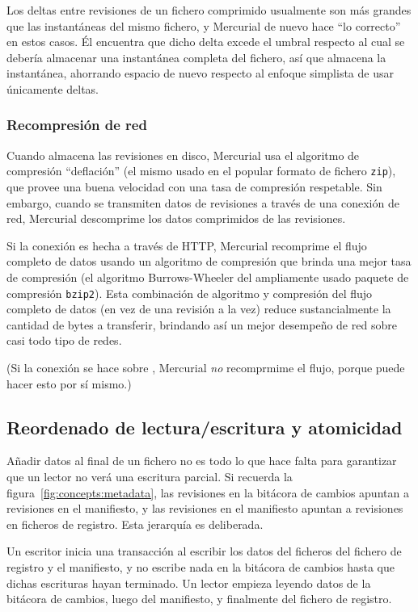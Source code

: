 Los deltas entre revisiones de un fichero comprimido usualmente son
más grandes que las instantáneas del mismo fichero, y Mercurial de
nuevo hace ``lo correcto'' en estos casos. Él encuentra que dicho
delta excede el umbral respecto al cual se debería almacenar una
instantánea completa del fichero, así que almacena la instantánea,
ahorrando espacio de nuevo respecto al enfoque simplista de usar
únicamente deltas.

\subsubsection{Recompresión de red}

Cuando almacena las revisiones en disco, Mercurial usa el algoritmo de
compresión ``deflación'' (el mismo usado en el popular formato de
fichero \texttt{zip}), que provee una buena velocidad con una tasa de
compresión respetable. Sin embargo, cuando se transmiten datos de
revisiones a través de una conexión de red, Mercurial descomprime los
datos comprimidos de las revisiones.

Si la conexión es hecha a través de HTTP, Mercurial recomprime el
flujo completo de datos usando un algoritmo de compresión que brinda
una mejor tasa de compresión (el algoritmo Burrows-Wheeler del
ampliamente usado paquete de compresión \texttt{bzip2}). Esta
combinación de algoritmo y compresión del flujo completo de datos
(en vez de una revisión a la vez) reduce sustancialmente la cantidad
de bytes a transferir, brindando así un mejor desempeño de red sobre
casi todo tipo de redes.

(Si la conexión se hace sobre , Mercurial \emph{no}
recomprmime el flujo, porque  puede hacer esto por sí
mismo.)

\subsection{Reordenado de lectura/escritura y atomicidad}

Añadir datos al final de un fichero no es todo lo que hace falta para
garantizar que un lector no verá una escritura parcial. Si recuerda la
figura~\ref{fig:concepts:metadata}, las revisiones en la bitácora de
cambios apuntan a revisiones en el manifiesto, y las revisiones en el
manifiesto apuntan a revisiones en ficheros de registro. Esta
jerarquía es deliberada.

Un escritor inicia una transacción al escribir los datos del ficheros
del fichero de registro y el manifiesto, y no escribe nada en la
bitácora de cambios hasta que dichas escrituras hayan terminado. Un
lector empieza leyendo datos de la bitácora de cambios, luego del
manifiesto, y finalmente del fichero de registro.

